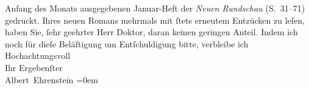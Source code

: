 \begin{ledgroupsized}[t]{13cm}
{{{                  Anfang des Monats ausgegebenen Januar-Heft der \emph{Neuen Rundschau} (S. 31–71) gedruckt.}}}\label{K_L01751_2h} Ihres
               neuen Romans mehrmals mit ſtets
               erneutem Entzücken zu leſen, haben Sie, ſehr geehrter Herr Doktor, daran keinen
               geringen Anteil.\pend
           \pstart
           {\pb}Indem ich noch für dieſe Beläſtigung um
               Entſchuldigung bitte, verbleibe ich\pend
           \pstart
           Hochachtungsvoll{\\[\baselineskip]}Ihr Ergebenſter{\\[\baselineskip]}\spacefill\mbox{Albert Ehrenstein}\pend
           \leftskip=0em{}
         
         \endnumbering{}\end{ledgroupsized}  \newcommand{\dateiname}{L01751}\newcommand{\titel}{Albert Ehrenstein an Arthur Schnitzler, 16. 1. 1908}\newcommand{\editorInnen}{Martin Anton Müller und Gerd-Hermann Susen}
      